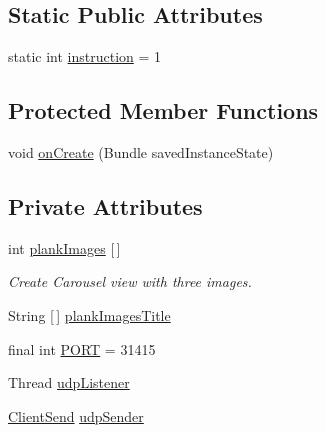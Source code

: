 \subsection*{Static Public Attributes}
\begin{DoxyCompactItemize}
\item 
static int \mbox{\hyperlink{classcom_1_1example_1_1trainawearapplication_1_1_plank_a78c9024e55b5817aa05befcff69394c3}{instruction}} = 1
\end{DoxyCompactItemize}
\subsection*{Protected Member Functions}
\begin{DoxyCompactItemize}
\item 
void \mbox{\hyperlink{classcom_1_1example_1_1trainawearapplication_1_1_plank_a8071af6c71d817914e58bd99b92c0904}{on\+Create}} (Bundle saved\+Instance\+State)
\end{DoxyCompactItemize}
\subsection*{Private Attributes}
\begin{DoxyCompactItemize}
\item 
int \mbox{\hyperlink{classcom_1_1example_1_1trainawearapplication_1_1_plank_af0574ebfbf8f016aebe193e5694c53fa}{plank\+Images}} \mbox{[}$\,$\mbox{]}
\begin{DoxyCompactList}\small\item\em Create Carousel view with three images. \end{DoxyCompactList}\item 
String \mbox{[}$\,$\mbox{]} \mbox{\hyperlink{classcom_1_1example_1_1trainawearapplication_1_1_plank_aaeb5339c942a37b01b333cd7cdeea57d}{plank\+Images\+Title}}
\item 
final int \mbox{\hyperlink{classcom_1_1example_1_1trainawearapplication_1_1_plank_afdb06528b46b1961c50dc081c3cf4557}{P\+O\+RT}} = 31415
\item 
Thread \mbox{\hyperlink{classcom_1_1example_1_1trainawearapplication_1_1_plank_ac43cc854533c5fc22b5638149d26512c}{udp\+Listener}}
\item 
\mbox{\hyperlink{classcom_1_1example_1_1trainawearapplication_1_1_client_send}{Client\+Send}} \mbox{\hyperlink{classcom_1_1example_1_1trainawearapplication_1_1_plank_a840985b7a4ec5f3092c91a8336e616e9}{udp\+Sender}}
\end{DoxyCompactItemize}


